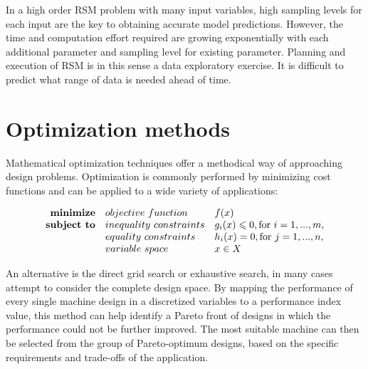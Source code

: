         
        In a high order \acs{RSM} problem with many input variables, high sampling levels for each input are the key to obtaining accurate model predictions. However, the time and computation effort required are growing exponentially with each additional parameter and sampling level for existing parameter. Planning and execution of \acs{RSM} is in this sense a data exploratory exercise. It is difficult to predict what range of data is needed ahead of time.


\section{Optimization methods}                      \label{Chapter:background/optimization methods}
    
    
    Mathematical optimization techniques offer a methodical way of approaching design problems. Optimization is commonly performed by minimizing cost functions and can be applied to a wide variety of applications:
    
        
    \begin{equation}
        \begin{array}{rll}
            \textbf{minimize}       & \small{objective\,\,function}         & f(x)\\ 
            \textbf{subject to}     & \small{inequality\,\,constraints}     & g_i(x) \leqslant 0, \text{for } i= 1,...,m,\\ 
                                    & \small{equality\,\,constraints}       & h_i(x) = 0, \text{for } j= 1,...,n,\\ 
                                    & \small{variable\,\,space}             & x \in X
        \end{array}
    \end{equation}
    
    
    An alternative is the direct grid search or exhaustive search, in many cases attempt to consider the complete design space. By mapping the performance of every single machine design in a discretized variables to a performance index value, this method can help identify a Pareto front of designs in which the performance could not be further improved. The most suitable machine can then be selected from the group of Pareto-optimum designs, based on the specific requirements and trade-offs of the application.
    
